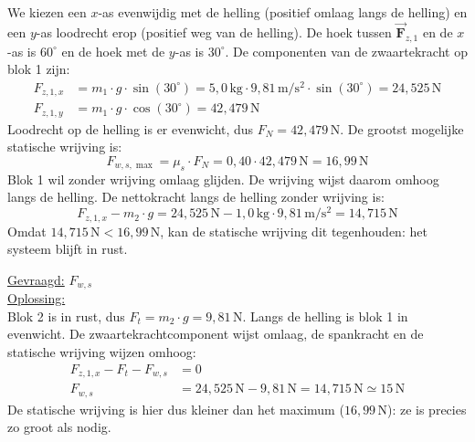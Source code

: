 \documentclass{ximera}
\begin{document}
\begin{exercise}
\begin{question}
\begin{solution}
            We kiezen een $x$-as evenwijdig met de helling (positief omlaag langs de helling) en een $y$-as loodrecht erop (positief weg van de helling). De hoek tussen $\vec{\mathbf{F}}_{z,1}$ en de $x$-as is $60^\circ$ en de hoek met de $y$-as is $30^\circ$. De componenten van de zwaartekracht op blok 1 zijn:
            \begin{align*}
                F_{z,1,x} &= m_{1} \cdot g \cdot \sin(30^\circ) = 5{,}0 \, \mathrm{kg} \cdot 9{,}81 \, \mathrm{m/s^2} \cdot \sin(30^\circ) = 24{,}525 \, \mathrm{N} \\
                F_{z,1,y} &= m_{1} \cdot g \cdot \cos(30^\circ) = 42{,}479 \, \mathrm{N}
            \end{align*}
            Loodrecht op de helling is er evenwicht, dus $F_{N} = 42{,}479 \, \mathrm{N}$. De grootst mogelijke statische wrijving is:
            \[
                F_{w,s,\max} = \mu_{s} \cdot F_{N} = 0{,}40 \cdot 42{,}479 \, \mathrm{N} = 16{,}99 \, \mathrm{N}
            \]
            Blok 1 wil zonder wrijving omlaag glijden. De wrijving wijst daarom omhoog langs de helling. De nettokracht langs de helling zonder wrijving is:
            \[
                F_{z,1,x} - m_{2} \cdot g = 24{,}525 \, \mathrm{N} - 1{,}0 \, \mathrm{kg} \cdot 9{,}81 \, \mathrm{m/s^2} = 14{,}715 \, \mathrm{N}
            \]
            Omdat $14{,}715 \, \mathrm{N} < 16{,}99 \, \mathrm{N}$, kan de statische wrijving dit tegenhouden: het systeem blijft in rust.


            \underline{Gevraagd:} $F_{w,s}$ \\

            \underline{Oplossing:}\\
            Blok 2 is in rust, dus $F_{t} = m_{2} \cdot g = 9{,}81 \, \mathrm{N}$. Langs de helling is blok 1 in evenwicht. De zwaartekrachtcomponent wijst omlaag, de spankracht en de statische wrijving wijzen omhoog:
            \begin{align*}
                F_{z,1,x} - F_{t} - F_{w,s} &= 0 \\
                F_{w,s} &= 24{,}525 \, \mathrm{N} - 9{,}81 \, \mathrm{N} = 14{,}715 \, \mathrm{N} \simeq \boxed{15 \, \mathrm{N}}
            \end{align*}
            De statische wrijving is hier dus kleiner dan het maximum ($16{,}99 \, \mathrm{N}$): ze is precies zo groot als nodig.
        \end{solution}
    \end{question}


\end{exercise}
\end{document}
